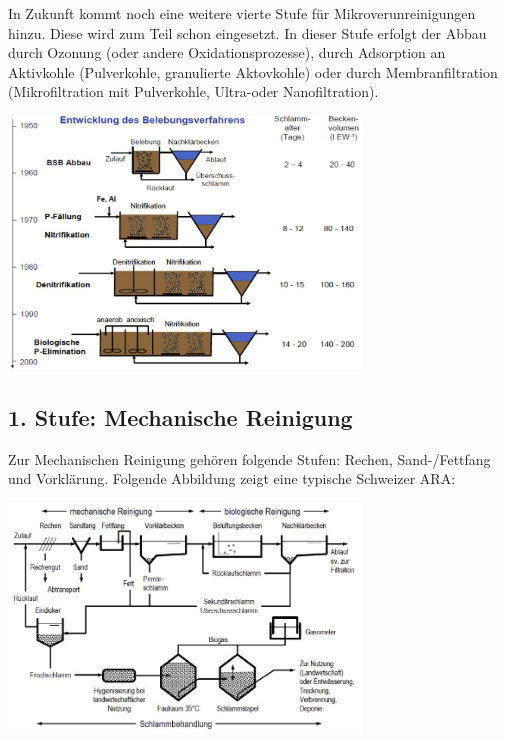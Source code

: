 \documentclass[9pt, openright=false]{scrartcl}
\begin{document}
In Zukunft kommt noch eine weitere vierte Stufe für Mikroverunreinigungen hinzu. Diese wird zum Teil schon eingesetzt. In dieser Stufe erfolgt der Abbau durch Ozonung (oder andere Oxidationsprozesse), durch Adsorption an Aktivkohle (Pulverkohle, granulierte Aktovkohle) oder durch Membranfiltration (Mikrofiltration mit Pulverkohle, Ultra-oder Nanofiltration).
\begin{center}
\includegraphics[width=0.7\textwidth]{images/entwicklungara}
\end{center}
\subsection{1. Stufe: Mechanische Reinigung}  
Zur Mechanischen Reinigung gehören folgende Stufen: Rechen, Sand-/Fettfang und Vorklärung. Folgende Abbildung zeigt eine typische Schweizer ARA:
\begin{center}
\includegraphics[width=0.7\textwidth]{images/ARA}
\end{center}
\end{document}
